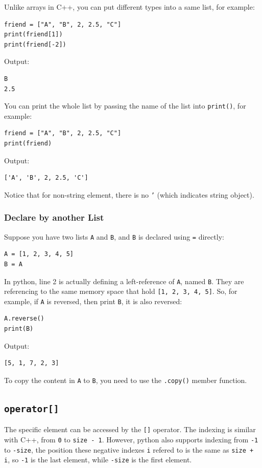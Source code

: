 \documentclass[12pt]{book}
\begin{document}
Unlike arrays in C++, you can put different types into a same list, for example:
\begin{verbatim}
friend = ["A", "B", 2, 2.5, "C"]
print(friend[1])
print(friend[-2])
\end{verbatim}
Output:
\begin{verbatim}
B
2.5
\end{verbatim}

You can print the whole list by passing the name of the list into \texttt{print()}, for example:
\begin{verbatim}
friend = ["A", "B", 2, 2.5, "C"]
print(friend)
\end{verbatim}
Output:
\begin{verbatim}
['A', 'B', 2, 2.5, 'C']
\end{verbatim}
Notice that for non-string element, there is no \texttt{'} (which indicates string object).
\subsubsection{Declare by another List}
\label{sec:org8962a38}
Suppose you have two lists \texttt{A} and \texttt{B}, and \texttt{B} is declared using \texttt{=} directly:
\begin{verbatim}
A = [1, 2, 3, 4, 5]
B = A
\end{verbatim}
In python, line 2 is actually defining a left-reference of \texttt{A}, named \texttt{B}. They are referencing to the same memory space that hold \texttt{[1, 2, 3, 4, 5]}. So, for example, if \texttt{A} is reversed, then print \texttt{B}, it is also reversed:
\begin{verbatim}
A.reverse()
print(B)
\end{verbatim}
Output:
\begin{verbatim}
[5, 1, 7, 2, 3]
\end{verbatim}

To copy the content in \texttt{A} to \texttt{B}, you need to use the \texttt{.copy()} member function.
\subsection{\texttt{operator[]}}
\label{sec:org1074466}
The specific element can be accessed by the \texttt{[]} operator. The indexing is similar with C++, from \texttt{0} to \texttt{size - 1}. However, python also supports indexing from \texttt{-1} to \texttt{-size}, the position these negative indexes \texttt{i} refered to is the same as \texttt{size + i}, so \texttt{-1} is the last element, while \texttt{-size} is the first element. 
\end{document}
